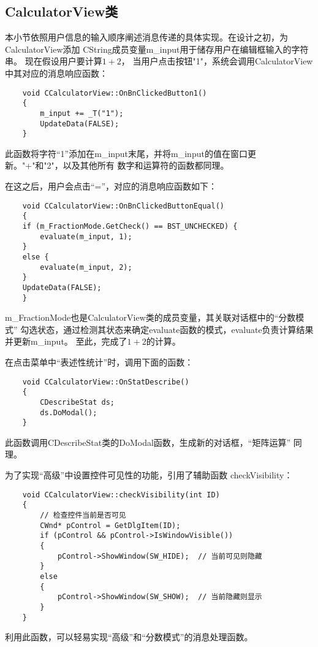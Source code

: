 \subsection{CalculatorView类}
本小节依照用户信息的输入顺序阐述消息传递的具体实现。在设计之初，为CalculatorView添加
CString成员变量m\_input用于储存用户在编辑框输入的字符串。
现在假设用户要计算$1+2$，
当用户点击按钮"1"，系统会调用CalculatorView中其对应的消息响应函数：
\begin{lstlisting}
    void CCalculatorView::OnBnClickedButton1()
    {
        m_input += _T("1");
        UpdateData(FALSE);
    }
\end{lstlisting}
此函数将字符“1”添加在m\_input末尾，并将m\_input的值在窗口更新。"+"和"2"，以及其他所有
数字和运算符的函数都同理。

在这之后，用户会点击“=”，对应的消息响应函数如下：
\begin{lstlisting}
    void CCalculatorView::OnBnClickedButtonEqual()
    {
	if (m_FractionMode.GetCheck() == BST_UNCHECKED) {
		evaluate(m_input, 1);
	}
	else {
		evaluate(m_input, 2);
	}
	UpdateData(FALSE);
    }
\end{lstlisting}
m\_FractionMode也是CalculatorView类的成员变量，其关联对话框中的“分数模式”
勾选状态，通过检测其状态来确定evaluate函数的模式，evaluate负责计算结果并更新m\_input。
至此，完成了$1+2$的计算。

在点击菜单中“表述性统计”时，调用下面的函数：
\begin{lstlisting}
    void CCalculatorView::OnStatDescribe()
    {
	    CDescribeStat ds;
	    ds.DoModal();
    }
\end{lstlisting}
此函数调用CDescribeStat类的DoModal函数，生成新的对话框，“矩阵运算”
同理。

为了实现“高级”中设置控件可见性的功能，引用了辅助函数
checkVisibility：
\begin{lstlisting}
    void CCalculatorView::checkVisibility(int ID)
    {
        // 检查控件当前是否可见
        CWnd* pControl = GetDlgItem(ID);
        if (pControl && pControl->IsWindowVisible())
        {
            pControl->ShowWindow(SW_HIDE);  // 当前可见则隐藏
        }
        else
        {
            pControl->ShowWindow(SW_SHOW);  // 当前隐藏则显示
        }
    }
\end{lstlisting}
利用此函数，可以轻易实现“高级”和“分数模式”的消息处理函数。